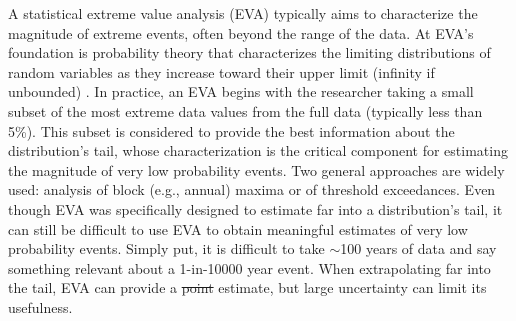 \documentclass{ametsocV6.1}
\providecommand{\DIFadd}[1]{{\protect\color{blue}\uwave{#1}}} %
\providecommand{\DIFdel}[1]{{\protect\color{red}\sout{#1}}}                      %
\providecommand{\DIFaddbegin}{} %
\providecommand{\DIFaddend}{} %
\providecommand{\DIFdelbegin}{} %
\providecommand{\DIFdelend}{} %
\newcommand{\DIFscaledelfig}{0.5}
\newlength{\DIFdelgraphicswidth} %
\newlength{\DIFdelgraphicsheight} %
\newcommand{\DIFaddincludegraphics}[2][]{{\color{blue}\fbox{\DIFOincludegraphics[#1]{#2}}}} %
\newcommand{\DIFdelincludegraphics}[2][]{%
\sbox{\DIFdelgraphicsbox}{\DIFOincludegraphics[#1]{#2}}%
\settoboxwidth{\DIFdelgraphicswidth}{\DIFdelgraphicsbox} %
\settoboxtotalheight{\DIFdelgraphicsheight}{\DIFdelgraphicsbox} %
\scalebox{\DIFscaledelfig}{%
\parbox[b]{\DIFdelgraphicswidth}{\usebox{\DIFdelgraphicsbox}\\[-\baselineskip] \rule{\DIFdelgraphicswidth}{0em}}\llap{\resizebox{\DIFdelgraphicswidth}{\DIFdelgraphicsheight}{%
\setlength{\unitlength}{\DIFdelgraphicswidth}%
\begin{picture}(1,1)%
\thicklines\linethickness{2pt} %
{\color[rgb]{1,0,0}\put(0,0){\framebox(1,1){}}}%
{\color[rgb]{1,0,0}\put(0,0){\line( 1,1){1}}}%
{\color[rgb]{1,0,0}\put(0,1){\line(1,-1){1}}}%
\end{picture}%
}\hspace*{3pt}}} %
} %
\DeclareRobustCommand{\DIFaddbegin}{\DIFOaddbegin \let\includegraphics\DIFaddincludegraphics} %
\DeclareRobustCommand{\DIFaddend}{\DIFOaddend \let\includegraphics\DIFOincludegraphics} %
\DeclareRobustCommand{\DIFdelbegin}{\DIFOdelbegin \let\includegraphics\DIFdelincludegraphics} %
\DeclareRobustCommand{\DIFdelend}{\DIFOaddend \let\includegraphics\DIFOincludegraphics} %
\begin{document}
A statistical extreme value analysis (EVA) typically aims to characterize the magnitude of extreme events, often beyond the range of the data.
At EVA's foundation is probability theory that characterizes the limiting distributions of random variables as they increase toward their upper limit (infinity if unbounded) \citep{coles2001introduction}.
In practice, an EVA begins with the researcher taking a small subset of the most extreme data values from the full data (typically \DIFaddbegin \DIFadd{much }\DIFaddend less than 5\%). This subset is considered to provide the best information about the distribution's tail, whose characterization is the critical component for estimating the magnitude of very low probability events. 
Two general approaches are widely used: analysis of block (e.g., annual) maxima or of threshold exceedances. %
Even though EVA was specifically designed to estimate far into a distribution's tail, 
it can still be difficult to use EVA to obtain meaningful estimates of very low probability events.
Simply put, it is difficult to take $\sim$100 years of data and say something relevant about a 1-in-10000 year event. 
When extrapolating far into the tail, EVA can provide a  \DIFdelbegin \DIFdel{point }\DIFdelend \DIFaddbegin \DIFadd{statistical }\DIFaddend estimate, but large uncertainty can limit its usefulness.

\end{document}
